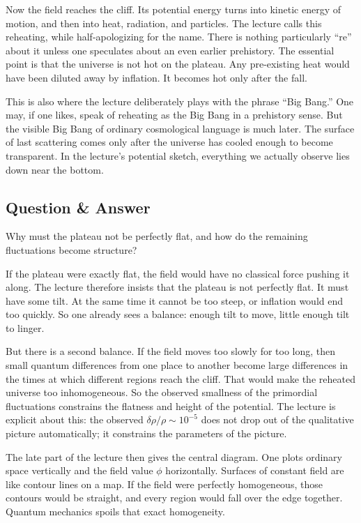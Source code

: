 Now the field reaches the cliff. Its potential energy turns into kinetic energy of motion, and then into heat, radiation, and particles. The lecture calls this reheating, while half-apologizing for the name. There is nothing particularly ``re'' about it unless one speculates about an even earlier prehistory. The essential point is that the universe is not hot on the plateau. Any pre-existing heat would have been diluted away by inflation. It becomes hot only after the fall.

This is also where the lecture deliberately plays with the phrase ``Big Bang.'' One may, if one likes, speak of reheating as the Big Bang in a prehistory sense. But the visible Big Bang of ordinary cosmological language is much later. The surface of last scattering comes only after the universe has cooled enough to become transparent. In the lecture's potential sketch, everything we actually observe lies down near the bottom.

\subsection{Question \& Answer}

Why must the plateau not be perfectly flat, and how do the remaining fluctuations become structure?

If the plateau were exactly flat, the field would have no classical force pushing it along. The lecture therefore insists that the plateau is not perfectly flat. It must have some tilt. At the same time it cannot be too steep, or inflation would end too quickly. So one already sees a balance: enough tilt to move, little enough tilt to linger.

But there is a second balance. If the field moves too slowly for too long, then small quantum differences from one place to another become large differences in the times at which different regions reach the cliff. That would make the reheated universe too inhomogeneous. So the observed smallness of the primordial fluctuations constrains the flatness and height of the potential. The lecture is explicit about this: the observed \(\delta\rho/\rho\sim 10^{-5}\) does not drop out of the qualitative picture automatically; it constrains the parameters of the picture.

The late part of the lecture then gives the central diagram. One plots ordinary space vertically and the field value \(\phi\) horizontally. Surfaces of constant field are like contour lines on a map. If the field were perfectly homogeneous, those contours would be straight, and every region would fall over the edge together. Quantum mechanics spoils that exact homogeneity.

